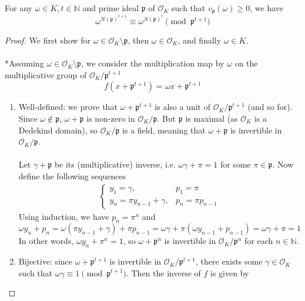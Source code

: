 \documentclass{treatise}
\begin{document}
\begin{lemma} \label{eul-totient-thm}
For any $\omega \in K, t \in \mathbb{N}$ and prime ideal $\mathfrak{p}$ of $\mathcal{O}_K$ such that $v_\mathfrak{p}(\omega) \geq 0$, we have
$$\omega^{N(\mathfrak{p})^{t + 1}} \equiv \omega^{N(\mathfrak{p})^t} \pmod{\mathfrak{p}^{t + 1}}$$
\end{lemma}
\begin{proof}
We first show for $\omega \in \mathcal{O}_K \setminus \mathfrak{p}$, then $\omega \in \mathcal{O}_K$, and finally $\omega \in K$.
\\
\\
*Assuming $\omega \in \mathcal{O}_K \setminus \mathfrak{p}$, we consider the multiplication map by $\omega$ on the multiplicative group of $\mathcal{O}_K / \mathfrak{p}^{t + 1}$
$$f (x + \mathfrak{p}^{t + 1}) = \omega x + \mathfrak{p}^{t + 1}$$
\begin{enumerate}
	\item Well-defined: we prove that $\omega + \mathfrak{p}^{t + 1}$ is also a unit of $\mathcal{O}_K / \mathfrak{p}^{t + 1}$ (and so for). Since $\omega \notin \mathfrak{p}$, $\omega + \mathfrak{p}$ is non-zero in $\mathcal{O}_K / \mathfrak{p}$. But $\mathfrak{p}$ is maximal (as $\mathcal{O}_K$ is a Dedekind domain), so $\mathcal{O}_K / \mathfrak{p}$ is a field, meaning that $\omega + \mathfrak{p}$ is invertible in $\mathcal{O}_K / \mathfrak{p}$.
	\\
	\\
	Let $\gamma + \mathfrak{p}$ be its (multiplicative) inverse, i.e. $\omega \gamma + \pi  = 1$ for some $\pi \in \mathfrak{p}$. Now define the following sequences
	\begin{align*}
	\begin{cases}
		y_1 = \gamma, & p_1 = \pi \\
		y_n = \pi y_{n - 1} + \gamma, & p_n = \pi p_{n - 1}
	\end{cases}
	\end{align*}
	Using induction, we have $p_n = \pi^n$ and
	$$\omega y_n  + p_n = \omega (\pi y_{n - 1} + \gamma) + \pi p_{n - 1} = \omega \gamma + \pi (\omega y_{n - 1} + p_{n - 1}) = \omega \gamma + \pi = 1$$
	In other words, $\omega y_n + \pi^n = 1$, so $\omega + \mathfrak{p}^n$ is invertible in $\mathcal{O}_K / \mathfrak{p}^n$ for each $n \in \mathbb{N}$.
	\item Bijective: since $\omega + \mathfrak{p}^{t + 1}$ is invertible in $\mathcal{O}_K / \mathfrak{p}^{t + 1}$, there exists some $\gamma \in \mathcal{O}_K$ such that $\omega \gamma \equiv 1 \pmod{\mathfrak{p}^{t + 1}}$. Then the inverse of $f$ is given by

\end{enumerate}
\end{proof}
\end{document}
